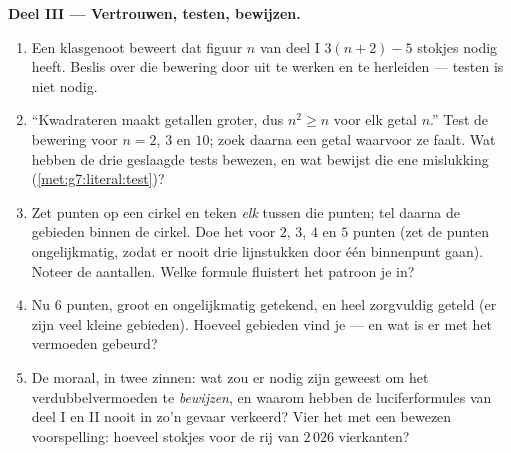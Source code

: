 \begin{problem}
\medskip
\noindent\textbf{Deel III --- Vertrouwen, testen, bewijzen.}
\begin{enumerate}[resume]
  \item Een klasgenoot beweert dat figuur $n$ van deel I $3(n + 2) - 5$ stokjes
        nodig heeft. Beslis over die bewering door uit te werken en te herleiden
        --- testen is niet nodig.
  \item ``Kwadrateren maakt getallen groter, dus $n^2 \geq n$ voor elk getal
        $n$.'' Test de bewering voor $n = 2$, $3$ en $10$; zoek daarna een getal
        waarvoor ze faalt. Wat hebben de drie geslaagde tests bewezen, en wat
        bewijst die ene mislukking (\cref{met:g7:literal:test})?
  \item Zet punten op een cirkel en teken \emph{elk}  tussen die punten;
        tel daarna de gebieden binnen de cirkel. Doe het voor $2$, $3$, $4$ en $5$
        punten (zet de punten ongelijkmatig, zodat er nooit drie lijnstukken door
        één binnenpunt gaan). Noteer de aantallen. Welke formule fluistert het
        patroon je in?
  \item Nu $6$ punten, groot en ongelijkmatig getekend, en heel zorgvuldig geteld
        (er zijn veel kleine gebieden). Hoeveel gebieden vind je --- en wat is er
        met het vermoeden gebeurd?
  \item De moraal, in twee zinnen: wat zou er nodig zijn geweest om het
        verdubbelvermoeden te \emph{bewijzen}, en waarom hebben de
        luciferformules van deel I en II nooit in zo'n gevaar verkeerd? Vier het
        met een bewezen voorspelling: hoeveel stokjes voor de rij van $2\,026$
        vierkanten?
\end{enumerate}
\end{problem}
